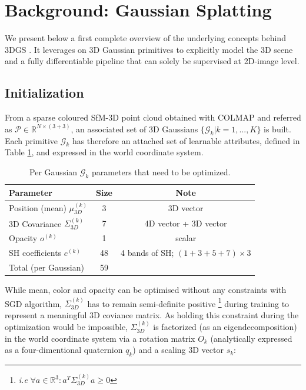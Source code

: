 \section{Background: Gaussian Splatting}
We present below a first complete overview of the underlying concepts behind 3D\ac{GS} \citep{kerbl20233d}. It leverages on 3D Gaussian primitives to explicitly model the 3D scene and a fully differentiable pipeline that can solely be supervised at 2D-image level. 

\subsection{Initialization} From a sparse coloured \ac{SfM}-3D point cloud obtained with COLMAP and referred as $\mathcal{P}\in\mathbb{R}^{N\times(3+3)}$, an associated set of 3D Gaussians $\{\mathcal{G}_{k}|k=1,...,K\}$ is built. Each primitive $\mathcal{G}_{k}$ has therefore an attached set of learnable attributes, defined in Table \ref{tab:gauss-param}, and expressed in the world coordinate system.

\begin{table}[h!]
  \centering
   \caption{Per Gaussian $\mathcal{G}_{k} $  parameters that need to be optimized.}
  \begin{tabular}{lcc}
  \hline
  Parameter  & Size & Note \\
  \hline
  Position (mean)  $\mu^{(k)}_{3D}$ & 3 & 3D vector  \\
  3D Covariance $\Sigma^{(k)}_{3D}$ & 7 & 4D vector + 3D vector \\
  Opacity  $o^{(k)}$ & 1 & scalar \\
  SH coefficients  $c^{(k)}$ & 48 & 4 bands of \ac{SH}; $(1+3+5+7)\times3$ \\
  \hline
  Total (per Gaussian)  & 59 & \\
  \hline
  \end{tabular}
 
  \label{tab:gauss-param}
\end{table}

While mean, color and opacity can be optimised without any constraints with \ac{SGD} algorithm, $\Sigma^{(k)}_{3D}$ has to remain semi-definite positive \footnote{\textit{i.e} $ \forall a \in \mathbb{R}^{3}: a^{T}\Sigma^{(k)}_{3D}a \geq 0$} during training to represent a meaningful 3D coviance matrix. As holding this constraint during the optimization would be impossible, $\Sigma^{(k)}_{3D}$ is factorized (as an eigendecomposition) in the world coordinate system via a rotation matrix $O_{k}$ (analytically expressed as a four-dimentional quaternion $q_{k}$) and a scaling 3D vector $s_{k}$: 

